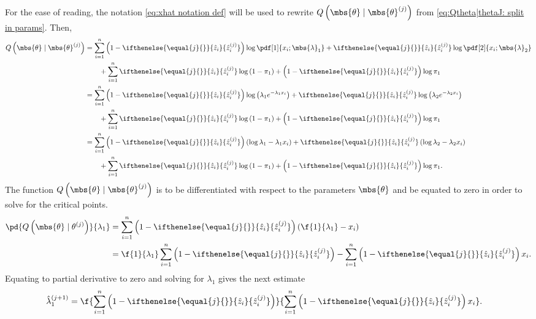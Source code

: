 \documentclass{tufte-handout}
\newcommand{\zhat}[2][{}]{\ifthenelse{\equal{#1}{}}{\hat{z}_{#2}}{\hat{z}_{#2}^{(#1)}}}
\begin{document}
    For the ease of reading, the notation \eqref{eq:xhat notation def} will be used to rewrite $Q\left( \mbs{\theta}\mid\mbs{\theta}^{(j)} \right)$ from \eqref{eq:Qtheta|thetaJ: split in params}. Then, 
    \begin{align}
        Q\left( \mbs{\theta} \mid \mbs{\theta}^{(j)} \right)
        &=
        \sum_{i=1}^{n} \left(1-\zhat[j]{i}\right) \log \pdf[1]{{x}_{i}; \mbs{\lambda}_{1}} + \zhat[j]{i}\log\pdf[2]{{x}_{i}; \mbs{\lambda}_{2}}
        \nonumber\\&\qquad
        +\sum_{i=1}^{n}\zhat[j]{i}\log\left( 1-\pi_{1} \right) + \left(1-\zhat[j]{i}\right)\log\pi_{1}\\
        &=
        \sum_{i=1}^{n} \left(1-\zhat[j]{i}\right) \log \left( \lambda_{1}e^{-\lambda_{1} x_{i}} \right) + \zhat[j]{i}\log\left(\lambda_{2}e^{-\lambda_{2} x_{i}}\right)
        \nonumber\\&\qquad
        +\sum_{i=1}^{n}\zhat[j]{i}\log\left( 1-\pi_{1} \right)  + \left(1-\zhat[j]{i}\right)\log\pi_{1}\\
        &=
        \sum_{i=1}^{n} \left(1-\zhat[j]{i}\right)  \left( \log\lambda_{1} -\lambda_{1} x_{i} \right) + \zhat[j]{i}\left(\log\lambda_{2} -\lambda_{2} x_{i}\right)
        \nonumber\\&\qquad
        +\sum_{i=1}^{n}\zhat[j]{i}\log\left( 1-\pi_{1} \right) + \left(1-\zhat[j]{i}\right)\log\pi_{1}.
    \end{align}
    The function $Q\left( \mbs{\theta}\mid \mbs{\theta}^{(j)} \right)$ is to be differentiated with respect to the parameters $\mbs{\theta}$ and be equated to zero in order to solve for the critical points.
    \begin{align}
        \pd{
            Q\left( \mbs{\theta}\mid{\theta}^{(j)} \right)
        }{
            \lambda_{1}
        }
        &= 
        \sum_{i=1}^{n} \left(1-\zhat[j]{i}\right)  \left( \f{1}{\lambda_{1}}- x_{i} \right)\\
        &= 
        \f{1}{\lambda_{1}}\sum_{i=1}^{n} \left(1-\zhat[j]{i}\right) 
        -
        \sum_{i=1}^{n} \left(1-\zhat[j]{i}\right) x_{i}.
    \end{align}
    Equating to partial derivative to zero and solving for $\lambda_{1}$ gives the next estimate
    \begin{align}
        \hat{\lambda}_{1}^{(j+1)} 
        &= 
        \f{
            \sum_{i=1}^{n} \left(1-\zhat[j]{i}\right)
        }{
            \sum_{i=1}^{n} \left(1-\zhat[j]{i}\right) x_{i}  
        }.
    \end{align}
\end{document}
